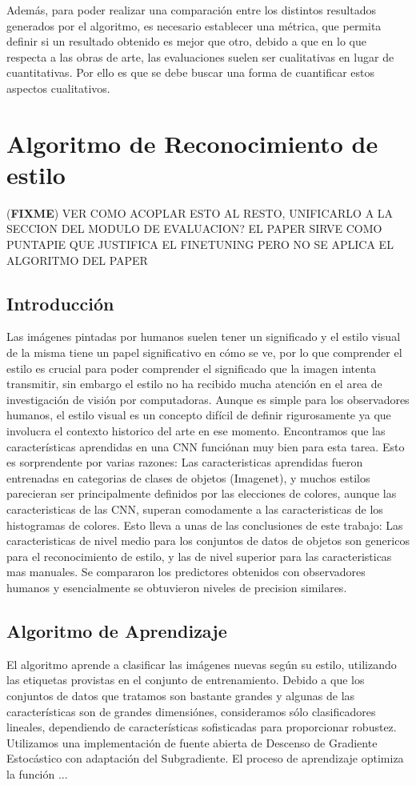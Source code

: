 \documentclass[a4paper,11pt,spanish]{book}
\newcommand*{\FIXME}[1]{{(\textbf{FIXME}) {#1}}}
\begin{document}
    Además, para poder realizar una comparación entre los distintos resultados generados por el algoritmo, es necesario establecer una métrica, que permita definir si un resultado 
    obtenido es mejor que otro, debido a que en lo que respecta a las obras de arte, las evaluaciones suelen ser cualitativas en lugar de cuantitativas. Por ello es que se debe
    buscar una forma de cuantificar estos aspectos cualitativos.
    
  \section{Algoritmo de Reconocimiento de estilo}
    \FIXME{VER COMO ACOPLAR ESTO AL RESTO, UNIFICARLO A LA SECCION DEL MODULO DE EVALUACION? EL PAPER SIRVE COMO PUNTAPIE QUE JUSTIFICA EL FINETUNING PERO NO SE APLICA EL ALGORITMO DEL PAPER}
    \subsection{Introducción}
      Las imágenes pintadas por humanos suelen tener un significado y el estilo visual de la misma tiene un papel significativo en cómo se ve, por lo que comprender
      el estilo es crucial para poder comprender el significado que la imagen intenta transmitir, sin embargo el estilo no ha recibido  mucha atención en el area de investigación de visión por computadoras. 
      Aunque es simple para los observadores humanos, el estilo visual es un concepto difícil de definir rigurosamente ya que involucra el contexto historico del arte en ese momento.
      Encontramos que las características aprendidas en una CNN funciónan muy bien para esta tarea. Esto es sorprendente por varias razones: Las caracteristicas aprendidas
      fueron entrenadas en categorias de clases de objetos (Imagenet), y muchos estilos parecieran ser principalmente definidos por las elecciones de colores, aunque
      las caracteristicas de las CNN, superan comodamente a las caracteristicas de los histogramas de colores. Esto lleva a unas de las conclusiones de este trabajo:
      Las caracteristicas de nivel medio para los conjuntos de datos de objetos son genericos para el reconocimiento de estilo, y las de nivel superior para las caracteristicas
      mas manuales.
      Se compararon los predictores obtenidos con observadores humanos y esencialmente se obtuvieron niveles de precision similares.
    \subsection{Algoritmo de Aprendizaje}
      El algoritmo aprende a clasificar las imágenes nuevas según su estilo, utilizando las etiquetas provistas en el conjunto de entrenamiento.
      Debido a que los conjuntos de datos que tratamos son bastante grandes y algunas de las características son de grandes dimensiónes, consideramos sólo clasificadores lineales, 
      dependiendo de características sofisticadas para proporcionar robustez. Utilizamos una implementación de fuente abierta de Descenso de Gradiente Estocástico con adaptación
      del Subgradiente. El proceso de aprendizaje optimiza la función ...
\end{document}
